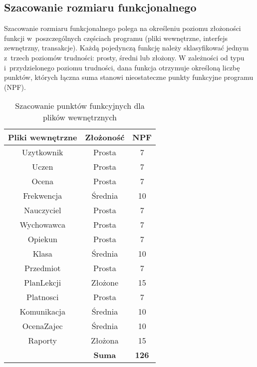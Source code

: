 \documentclass[12pt,leqno,twoside]{mwart}
\begin{document}
\subsection{Szacowanie rozmiaru funkcjonalnego}
\noindent Szacowanie rozmiaru funkcjonalnego polega na określeniu poziomu złożoności funkcji w~poszczególnych częściach programu (pliki wewnętrzne, interfejs zewnętrzny, transakcje). Każdą pojedynczą funkcję należy sklasyfikować jednym z~trzech poziomów trudności: prosty, średni lub złożony. W zależności od typu i~przydzielonego poziomu trudności, dana funkcja otrzymuje określoną liczbę punktów, których łączna suma stanowi nieostateczne punkty funkcyjne programu (NPF).\\
\begin{table}[h]
	\centering
	\caption{Szacowanie punktów funkcyjnych dla plików wewnętrznych}
		\renewcommand{\arraystretch}{1.2}
		\rule{0pt}{3ex}
		\begin{tabular}{c|c|c|}
		\hline
		\multicolumn{1}{|c|}{\textbf{Pliki wewnętrzne}} & \textbf{Złożoność} & \textbf{NPF} \\ \hline
		\multicolumn{1}{|c|}{Uzytkownik} 	& Prosta 	& 7 \\ \hline
		\multicolumn{1}{|c|}{Uczen} 		& Prosta 	& 7 \\ \hline
		\multicolumn{1}{|c|}{Ocena} 		& Prosta 	& 7 \\ \hline
		\multicolumn{1}{|c|}{Frekwencja} 	& Średnia 	& 10 \\ \hline
		\multicolumn{1}{|c|}{Nauczyciel} 	& Prosta 	& 7 \\ \hline
		\multicolumn{1}{|c|}{Wychowawca} 	& Prosta 	& 7 \\ \hline
		\multicolumn{1}{|c|}{Opiekun} 		& Prosta 	& 7 \\ \hline
		\multicolumn{1}{|c|}{Klasa} 		& Średnia 	& 10 \\ \hline
		\multicolumn{1}{|c|}{Przedmiot} 	& Prosta 	& 7 \\ \hline
		\multicolumn{1}{|c|}{PlanLekcji} 	& Złożone 	& 15 \\ \hline
		\multicolumn{1}{|c|}{Platnosci} 	& Prosta 	& 7 \\ \hline
		\multicolumn{1}{|c|}{Komunikacja} & Średnia 	& 10 \\ \hline
		\multicolumn{1}{|c|}{OcenaZajec} 	& Średnia 	& 10 \\ \hline
		\multicolumn{1}{|c|}{Raporty} 	& Złożona 	& 15 \\ \hline
					& \textbf{Suma}	& \textbf{126} \\ \cline{2-3}
		\end{tabular}
	\label{pkt_fun_struktury}
\end{table}
\end{document}
